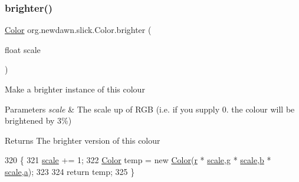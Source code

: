 \subsubsection{\texorpdfstring{brighter()}{brighter()}\hspace{0.1cm}{\footnotesize\ttfamily [2/2]}}
{\footnotesize\ttfamily \mbox{\hyperlink{classorg_1_1newdawn_1_1slick_1_1_color}{Color}} org.\+newdawn.\+slick.\+Color.\+brighter (\begin{DoxyParamCaption}\item[{float}]{scale }\end{DoxyParamCaption})\hspace{0.3cm}{\ttfamily [inline]}}

Make a brighter instance of this colour


\begin{DoxyParams}{Parameters}
{\em scale} & The scale up of R\+GB (i.\+e. if you supply 0. the colour will be brightened by 3\%) \\
\hline
\end{DoxyParams}
\begin{DoxyReturn}{Returns}
The brighter version of this colour 
\end{DoxyReturn}

\begin{DoxyCode}
320                                        \{
321         \mbox{\hyperlink{classorg_1_1newdawn_1_1slick_1_1_color_a53597f62e247b2193191c3c2a9828fa1}{scale}} += 1;
322         \mbox{\hyperlink{classorg_1_1newdawn_1_1slick_1_1_color_a39db992a7910141605cc2acb953c4917}{Color}} temp = \textcolor{keyword}{new} \mbox{\hyperlink{classorg_1_1newdawn_1_1slick_1_1_color_a39db992a7910141605cc2acb953c4917}{Color}}(\mbox{\hyperlink{classorg_1_1newdawn_1_1slick_1_1_color_ac07fa95108064b044dcf9a53e95dcb48}{r}} * \mbox{\hyperlink{classorg_1_1newdawn_1_1slick_1_1_color_a53597f62e247b2193191c3c2a9828fa1}{scale}},\mbox{\hyperlink{classorg_1_1newdawn_1_1slick_1_1_color_aa6ebff7c102a1476e7b511a78397b753}{g}} * \mbox{\hyperlink{classorg_1_1newdawn_1_1slick_1_1_color_a53597f62e247b2193191c3c2a9828fa1}{scale}},\mbox{\hyperlink{classorg_1_1newdawn_1_1slick_1_1_color_a8c0cef152e16438fee852a97e50ef7a5}{b}} * 
      \mbox{\hyperlink{classorg_1_1newdawn_1_1slick_1_1_color_a53597f62e247b2193191c3c2a9828fa1}{scale}},\mbox{\hyperlink{classorg_1_1newdawn_1_1slick_1_1_color_ab9288c822ff7614a77c887eb8c2595a7}{a}});
323         
324         \textcolor{keywordflow}{return} temp;
325     \}
\end{DoxyCode}
\mbox{\label{classorg_1_1newdawn_1_1slick_1_1_color_a73c0dbf7349167bcc646ff07cff719a1}} 
